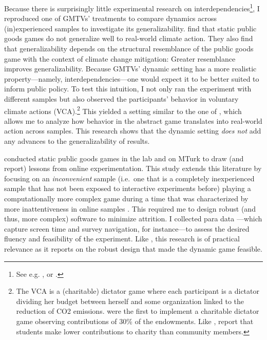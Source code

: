\documentclass[
  authoryear,
  review,
  3p,
  onecolumn]{elsarticle}
\begin{document}
Because there is surprisingly little experimental research on
interdependencies\footnote{See e.g. \citet{BattagliniEtAl2016},
  \citet{Rockenbach2017} or \citet{Moser2019}.}, I reproduced one of
GMTVs' treatments to compare dynamics across (in)experienced samples to
investigate its generalizability. \citet{GKLS2020} find that static
public goods games do not generalize well to real-world climate action.
They also find that generalizability depends on the structural
resemblance of the public goods game with the context of climate change
mitigation: Greater resemblance improves generalizability. Because
GMTVs' dynamic setting has a more realistic property---namely,
interdependencies---one would expect it to be better suited to inform
public policy. To test this intuition, I not only ran the experiment
with different samples but also observed the participants' behavior in
voluntary climate actions (VCA).\footnote{The VCA is a (charitable)
  dictator game where each participant is a dictator dividing her budget
  between herself and some organization linked to the reduction of CO2
  emissions. \citet{EckelGrossman1996} were the first to implement a
  charitable dictator game observing contributions of 30\% of the
  endowments. Like \citet{GKLS2020}, \citet{CarpenterEtAl2008} report
  that students make lower contributions to charity than community
  members.} This yielded a setting similar to the one of
\citet{GKLS2020}, which allows me to analyze how behavior in the
abstract game translates into real-world action across samples. This
research shows that the dynamic setting \emph{does not} add any advances
to the generalizability of results.

\citet{AGM2018} conducted static public goods games in the lab and on
MTurk to draw (and report) lessons from online experimentation. This
study extends this literature \citetext{\citealp[see,
e.g.,][\citet{AmirEtAl2012}]{KrantzEtAl1997}; \citealp{KleinEtAl2014}; \citealp{PaolacciChandler2014}; \citealp{GoodmanPaolacci2017}; \citealp{SnowbergYariv_2021}; \citealp{GuptaRigottiWilson_2021}; \citealp{BusoEtAl2021}}
by focusing on an \emph{inconvenient} sample (i.e.~one that is a
completely inexperienced sample \citep[see also][]{BenndorfEtAl2017}
that has not been exposed to interactive experiments before) playing a
computationally more complex game during a time that was characterized
by more inattentiveness in online samples
\citep{ArecharRand2021, PeytonEtAl2022}. This required me to design
robust (and thus, more complex) software to minimize attrition. I
collected para data \citep[ p.~12]{Parsons2022}---which capture screen
time and survey navigation, for instance---to assess the desired fluency
and feasibility of the experiment. Like \citet{AGM2018}, this research
is of practical relevance as it reports on the robust design that made
the dynamic game feasible.
\end{document}
